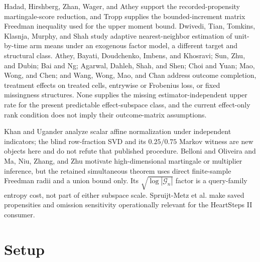 \documentclass{article}
\begin{document}
Hadad, Hirshberg, Zhan, Wager, and Athey support the recorded-propensity martingale-score reduction, and Tropp supplies the bounded-increment matrix Freedman inequality used for the upper moment bound.  Dwivedi, Tian, Tomkins, Klasnja, Murphy, and Shah study adaptive nearest-neighbor estimation of unit-by-time arm means under an exogenous factor model, a different target and structural class.  Athey, Bayati, Doudchenko, Imbens, and Khosravi; Sun, Zhu, and Dubin; Bai and Ng; Agarwal, Dahleh, Shah, and Shen; Choi and Yuan; Mao, Wong, and Chen; and Wang, Wong, Mao, and Chan address outcome completion, treatment effects on treated cells, entrywise or Frobenius loss, or fixed missingness structures.  None supplies the missing estimator-independent upper rate for the present predictable effect-subspace class, and the current effect-only rank condition does not imply their outcome-matrix assumptions.

Khan and Ugander analyze scalar affine normalization under independent indicators; the blind row-fraction SVD and its \(0.25/0.75\) Markov witness are new objects here and do not refute that published procedure.  Belloni and Oliveira and Ma, Niu, Zhang, and Zhu motivate high-dimensional martingale or multiplier inference, but the retained simultaneous theorem uses direct finite-sample Freedman radii and a union bound only.  Its \(\sqrt{\log|\mathcal G_n|}\) factor is a query-family entropy cost, not part of either subspace scale.  Spruijt-Metz et al. make saved propensities and omission sensitivity operationally relevant for the HeartSteps II consumer.

\section{Setup}
\end{document}
